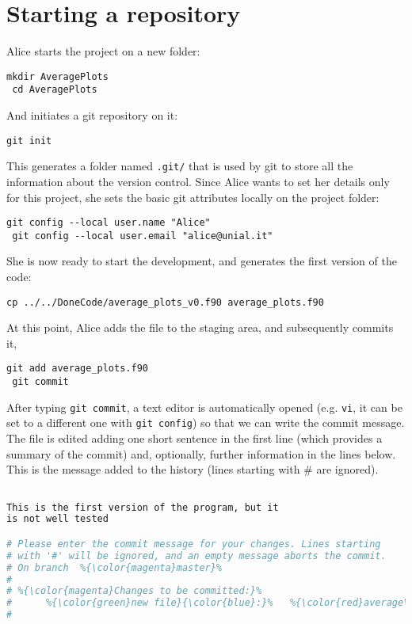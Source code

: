 \documentclass[a4paper,10pt]{article}
\begin{document}
\clearpage

\section{Starting a repository}

Alice starts the project on a new folder:

\begin{lstlisting}[style=Alice]
 mkdir AveragePlots  
 cd AveragePlots
\end{lstlisting}

And initiates a git repository on it:

\begin{lstlisting}[style=Alice]
 git init
\end{lstlisting}

This generates a folder named \texttt{.git/} that is used by git to store all the information about the version control. Since Alice wants to set her details only for this project, she sets the basic git attributes locally on the project folder:

\begin{lstlisting}[style=Alice]
 git config --local user.name "Alice"
 git config --local user.email "alice@unial.it"
\end{lstlisting}

She is now ready to start the development, and generates the first version of the code:

\begin{lstlisting}[style=AliceFake]
 cp ../../DoneCode/average_plots_v0.f90 average_plots.f90
\end{lstlisting}

At this point, Alice adds the file to the staging area, and subsequently commits it,

\begin{lstlisting}[style=Alice]
 git add average_plots.f90
 git commit
\end{lstlisting}

After typing \texttt{git commit}, a text editor is automatically opened (e.g. \texttt{vi}, it can be set to a different one with \texttt{git config}) so that we can write the commit message. The file is edited adding one short sentence in the first line (which provides a summary of the commit) and, optionally, further information in the lines below. This is the message added to the history (lines starting with \# are ignored).

\begin{lstlisting}[style=Text,language=bash,commentstyle=\color{blue},linewidth=0.96\linewidth,xleftmargin=0.05\linewidth]
%{\color{red!50!yellow!90!}Starting repository with first version of the code}%

This is the first version of the program, but it
is not well tested

# Please enter the commit message for your changes. Lines starting
# with '#' will be ignored, and an empty message aborts the commit.
# On branch  %{\color{magenta}master}%
#
# %{\color{magenta}Changes to be committed:}%
#      %{\color{green}new file}{\color{blue}:}%   %{\color{red}average\_plots.f90}%
#
\end{lstlisting}
\end{document}
